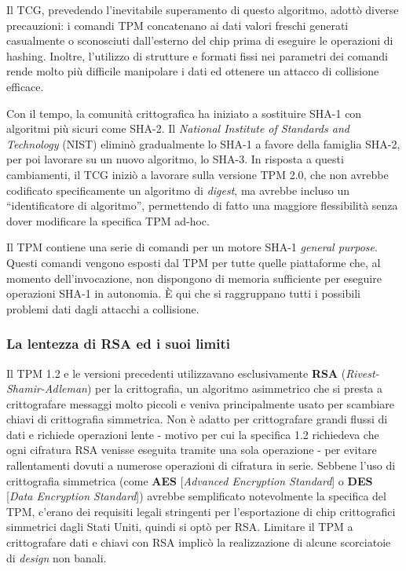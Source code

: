 Il TCG, prevedendo l’inevitabile superamento di questo algoritmo, adottò diverse precauzioni: i comandi TPM concatenano ai dati valori freschi generati casualmente o sconosciuti dall’esterno del chip prima di eseguire le operazioni di hashing. Inoltre, l’utilizzo di strutture e formati fissi nei parametri dei comandi rende molto più difficile manipolare i dati ed ottenere un attacco di collisione efficace.

Con il tempo, la comunità crittografica ha iniziato a sostituire SHA-1 con algoritmi più sicuri come SHA-2. Il \textit{National Institute of Standards and Technology} (NIST) eliminò gradualmente lo SHA-1 a favore della famiglia SHA-2, per poi lavorare su un nuovo algoritmo, lo SHA-3. In risposta a questi cambiamenti, il TCG iniziò a lavorare sulla versione TPM 2.0, che non avrebbe codificato specificamente un algoritmo di \textit{digest}, ma avrebbe incluso un “identificatore di algoritmo”, permettendo di fatto una maggiore flessibilità senza dover modificare la specifica TPM ad-hoc.

Il TPM contiene una serie di comandi per un motore SHA-1 \textit{general purpose}. Questi comandi vengono esposti dal TPM per tutte quelle piattaforme che, al momento dell’invocazione, non dispongono di memoria sufficiente per eseguire operazioni SHA-1 in autonomia. È qui che si raggruppano tutti i possibili problemi dati dagli attacchi a collisione.

\subsubsection{La lentezza di RSA ed i suoi limiti}
Il TPM 1.2 e le versioni precedenti utilizzavano esclusivamente \textbf{RSA} (\textit{Rivest-Shamir-Adleman}) per la crittografia, un algoritmo asimmetrico che si presta a crittografare messaggi molto piccoli e veniva principalmente usato per scambiare chiavi di crittografia simmetrica. Non è adatto per crittografare grandi flussi di dati e richiede operazioni lente - motivo per cui la specifica 1.2 richiedeva che ogni cifratura RSA venisse eseguita tramite una sola operazione - per evitare rallentamenti dovuti a numerose operazioni di cifratura in serie. 
Sebbene l'uso di crittografia simmetrica (come \textbf{AES} [\textit{Advanced Encryption Standard}] o \textbf{DES} [\textit{Data Encryption Standard}]) avrebbe semplificato notevolmente la specifica del TPM, c’erano dei requisiti legali stringenti per l'esportazione di chip crittografici simmetrici dagli Stati Uniti, quindi si optò per RSA. Limitare il TPM a crittografare dati e chiavi con RSA implicò la realizzazione di alcune scorciatoie di \textit{design} non banali.

